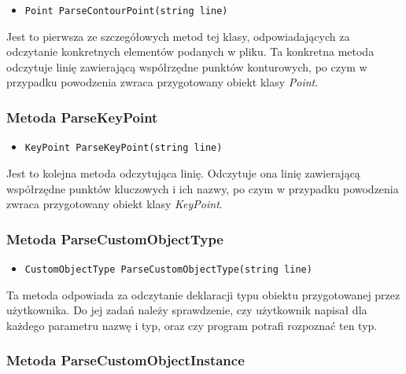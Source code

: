 \documentclass[a4paper,11pt]{article}
\newcommand\tab[1][0.6cm]{\hspace*{#1}}
\begin{document}
\begin{itemize}
\item \begin{lstlisting}
Point ParseContourPoint(string line)
\end{lstlisting}
\end{itemize}

\tab Jest to pierwsza ze szczegółowych metod tej klasy, odpowiadających za odczytanie konkretnych elementów podanych w pliku. Ta konkretna metoda odczytuje linię zawierającą współrzędne punktów konturowych, po czym w przypadku powodzenia zwraca przygotowany obiekt klasy \textit{Point}.

\subsubsection{Metoda ParseKeyPoint}

\begin{itemize}
\item \begin{lstlisting}
KeyPoint ParseKeyPoint(string line)
\end{lstlisting}
\end{itemize}

\tab Jest to kolejna metoda odczytująca linię. Odczytuje ona linię zawierającą współrzędne punktów kluczowych i ich nazwy, po czym w przypadku powodzenia zwraca przygotowany obiekt klasy \textit{KeyPoint}.

\subsubsection{Metoda ParseCustomObjectType}

\begin{itemize}
\item \begin{lstlisting}
CustomObjectType ParseCustomObjectType(string line)
\end{lstlisting}
\end{itemize}

\tab Ta metoda odpowiada za odczytanie deklaracji typu obiektu przygotowanej przez użytkownika. Do jej zadań należy sprawdzenie, czy użytkownik napisał dla każdego parametru nazwę i typ, oraz czy program potrafi rozpoznać ten typ.

\subsubsection{Metoda ParseCustomObjectInstance}
\end{document}
